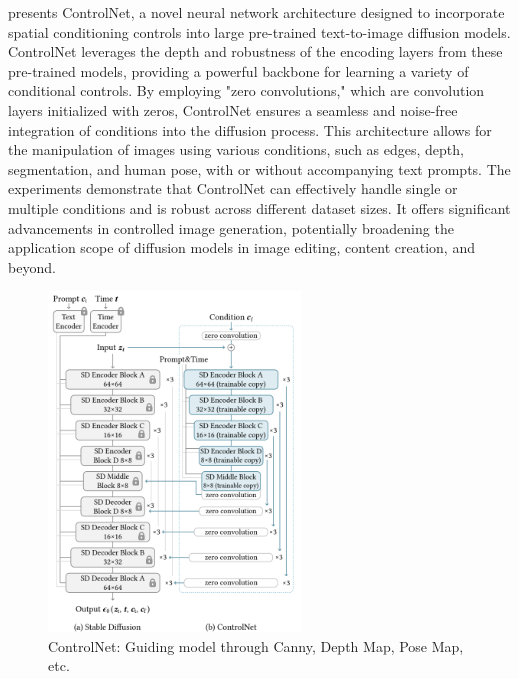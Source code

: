 \cite*{ControlNet} presents ControlNet, a novel neural network architecture designed to incorporate spatial conditioning controls into large pre-trained text-to-image diffusion models. ControlNet leverages the depth and robustness of the encoding layers from these pre-trained models, providing a powerful backbone for learning a variety of conditional controls. By employing "zero convolutions," which are convolution layers initialized with zeros, ControlNet ensures a seamless and noise-free integration of conditions into the diffusion process. This architecture allows for the manipulation of images using various conditions, such as edges, depth, segmentation, and human pose, with or without accompanying text prompts. The experiments demonstrate that ControlNet can effectively handle single or multiple conditions and is robust across different dataset sizes. It offers significant advancements in controlled image generation, potentially broadening the application scope of diffusion models in image editing, content creation, and beyond.








\begin{figure}[H]
    \centering
    \includegraphics[width=0.60\textwidth]{images/controlnet.png} %
    \caption{ControlNet: Guiding model through Canny, Depth Map, Pose Map, etc. \cite*{ControlNet}}
\end{figure}


